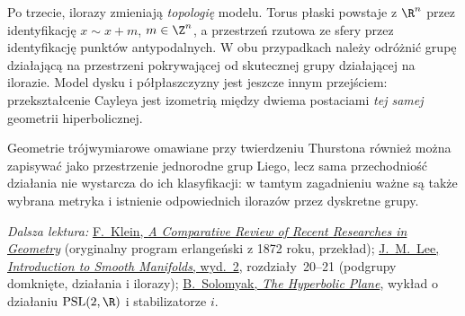 Po trzecie, ilorazy zmieniają \emph{topologię} modelu.
Torus płaski powstaje z $\R^n$ przez identyfikację
$x\sim x+m$, $m\in\Z^n$, a przestrzeń rzutowa ze
sfery przez identyfikację punktów antypodalnych.
W obu przypadkach należy odróżnić grupę działającą na
przestrzeni pokrywającej od skutecznej grupy działającej
na ilorazie. Model dysku i półpłaszczyzny jest jeszcze
innym przejściem: przekształcenie Cayleya jest
izometrią między dwiema postaciami \emph{tej samej}
geometrii hiperbolicznej.

Geometrie trójwymiarowe omawiane przy twierdzeniu
Thurstona również można zapisywać jako przestrzenie
jednorodne grup Liego, lecz sama przechodniość działania
nie wystarcza do ich klasyfikacji: w tamtym zagadnieniu
ważne są także wybrana metryka i istnienie odpowiednich
ilorazów przez dyskretne grupy.

\par\smallskip
{\footnotesize\noindent\emph{Dalsza lektura:}
\href{https://math.ucr.edu/home/baez/erlangen/Klein-erlangen.pdf}
{F.\ Klein, \emph{A Comparative Review of Recent Researches in Geometry}}
(oryginalny program erlangeński z 1872 roku, przekład);
\href{https://link.springer.com/book/10.1007/978-1-4419-9982-5}
{J.\ M.\ Lee, \emph{Introduction to Smooth Manifolds}, wyd.~2},
rozdziały~20--21 (podgrupy domknięte, działania i ilorazy);
\href{https://u.math.biu.ac.il/~solomyb/TEACH/21/GrAct/Lec5b.pdf}
{B.\ Solomyak, \emph{The Hyperbolic Plane}},
wykład o działaniu $\mathrm{PSL}(2,\R)$ i stabilizatorze $i$.\par}
